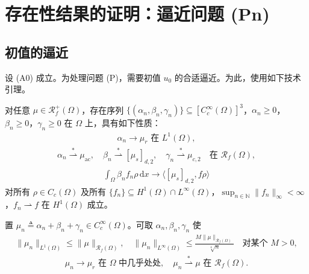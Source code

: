 \documentclass[../../main.tex]{subfiles}%
\begin{document}
\section{存在性结果的证明：逼近问题 (Pn)}\label{section:ch06-逼近问题}

\subsection{初值的逼近}\label{subsection:ch06-初值逼近}

设 (A0) 成立。为处理问题 (P)，需要初值 $u_0$ 的合适逼近。为此，使用如下技术引理。

\begin{lemma}\label{lemma:ch06-6.5.1}
对任意 $\mu\in\mathscr{R}^+_f(\Omega)$，存在序列 $\{(\alpha_n,\beta_n,\gamma_n)\}\subseteq[C^\infty_c(\Omega)]^3$，$\alpha_n\geqslant0$，$\beta_n\geqslant0$，$\gamma_n\geqslant0$ 在 $\Omega$ 上，具有如下性质：
\begin{align}
\alpha_n\to\mu_r \text{ 在 }L^1(\Omega), \label{align:ch6-6.41a}
\end{align}
\begin{align}
\alpha_n\stackrel{*}{\rightharpoonup}\mu_{\mathrm{ac}},\quad
\beta_n\stackrel{*}{\rightharpoonup}[\mu_s]_{d,2},\quad
\gamma_n\stackrel{*}{\rightharpoonup}\mu_{c,2}
\quad\text{在 }\mathscr{R}_f(\Omega), \label{align:ch6-6.41b}
\end{align}
\begin{align}
\int_\Omega\beta_n f_n\rho\,\mathrm{d}x\to\langle[\mu_s]_{d,2},f\rho\rangle \label{align:ch6-6.41c}
\end{align}
对所有 $\rho\in C_c(\Omega)$ 及所有 $\{f_n\}\subseteq H^1(\Omega)\cap L^\infty(\Omega)$，$\sup_{n\in\mathbb{N}}\|f_n\|_\infty<\infty$，$f_n\rightharpoonup f$ 在 $H^1(\Omega)$ 成立。

置 $\mu_n\triangleq \alpha_n+\beta_n+\gamma_n\in C^\infty_c(\Omega)$。可取 $\alpha_n,\beta_n,\gamma_n$ 使
\begin{align}
\|\mu_n\|_{L^1(\Omega)}\leqslant\|\mu\|_{\mathscr{R}_f(\Omega)},\quad
\|\mu_n\|_{L^\infty(\Omega)}\leqslant\frac{M\|\mu\|_{\mathscr{R}_f(\Omega)}}{\sqrt[4]{n}}
\quad\text{对某个 }M>0, \label{align:ch6-6.41d}
\end{align}
\begin{align}
\mu_n\to\mu_r \text{ 在 }\Omega\text{ 中几乎处处},\quad
\mu_n\stackrel{*}{\rightharpoonup}\mu \text{ 在 }\mathscr{R}_f(\Omega). \label{align:ch6-6.41e}
\end{align}
\end{lemma}
\end{document}
